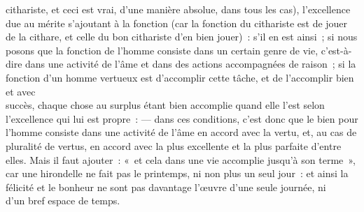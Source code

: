 \documentclass[french,twoside]{book} %
\begin{document}
cithariste, et ceci est vrai, d’une manière absolue, dans tous les cas), l’excellence due au mérite s’ajoutant à la fonction (car la fonction du cithariste est de jouer de la cithare, et celle du bon cithariste d’en bien jouer) : s’il en est ainsi ; si nous posons que la fonction de l’homme consiste dans un certain genre de vie, c’est-à-dire dans une activité de l’âme et dans des actions accompagnées de raison ; si la fonction d’un homme vertueux est d’accomplir cette tâche, et de l’accomplir bien et avec \\
succès, chaque chose au surplus étant bien accomplie quand elle l’est selon l’excellence qui lui est propre : — dans ces conditions, c’est donc que le bien pour l’homme consiste dans une activité de l’âme en accord avec la vertu, et, au cas de pluralité de vertus, en accord avec la plus excellente et la plus parfaite d’entre elles. Mais il faut ajouter : « et cela dans une vie accomplie jusqu’à son terme », car une hirondelle ne fait pas le printemps, ni non plus un seul jour : et ainsi la félicité et le bonheur ne sont pas davantage l’œuvre d’une seule journée, ni \\
d’un bref espace de temps.
\end{document}
